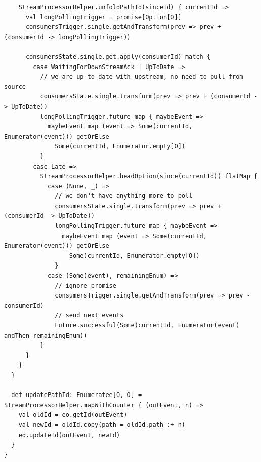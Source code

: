 \begin{verbatim}
    StreamProcessorHelper.unfoldPathId(sinceId) { currentId =>
      val longPollingTrigger = promise[Option[O]]
      consumersTrigger.single.getAndTransform(prev => prev + (consumerId -> longPollingTrigger))

      consumersState.single.get.apply(consumerId) match {
        case WaitingForDownStreamAck | UpToDate =>
          // we are up to date with upstream, no need to pull from source
          consumersState.single.transform(prev => prev + (consumerId -> UpToDate))
          longPollingTrigger.future map { maybeEvent =>
            maybeEvent map (event => Some(currentId, Enumerator(event))) getOrElse 
              Some(currentId, Enumerator.empty[O])
          }
        case Late =>
          StreamProcessorHelper.headOption(since(currentId)) flatMap {
            case (None, _) =>
              // we don't have anything more to poll
              consumersState.single.transform(prev => prev + (consumerId -> UpToDate))
              longPollingTrigger.future map { maybeEvent =>
                maybeEvent map (event => Some(currentId, Enumerator(event))) getOrElse 
                  Some(currentId, Enumerator.empty[O])
              }
            case (Some(event), remainingEnum) =>
              // ignore promise
              consumersTrigger.single.getAndTransform(prev => prev - consumerId)
              // send next events
              Future.successful(Some(currentId, Enumerator(event) andThen remainingEnum))
          }
      }
    }
  }

  def updatePathId: Enumeratee[O, O] = StreamProcessorHelper.mapWithCounter { (outEvent, n) =>
    val oldId = eo.getId(outEvent)
    val newId = oldId.copy(path = oldId.path :+ n)
    eo.updateId(outEvent, newId)
  }
}
\end{verbatim}


